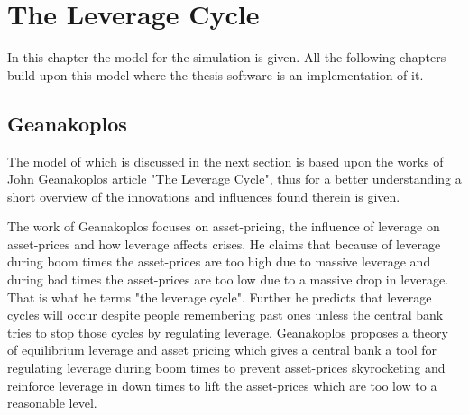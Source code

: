 \documentclass[../Bachelorarbeit.tex]{subfiles}
\begin{document}
\chapter{The Leverage Cycle}
\label{ch:leverageCycle}

In this chapter the model for the simulation is given. All the following chapters build upon this model where the thesis-software is an implementation of it. 

\section{Geanakoplos}
The model of \cite{Breuer2015} which is discussed in the next section is based upon the works of John Geanakoplos article \cite{Geanakoplos2009} "The Leverage Cycle", thus for a better understanding a short overview of the innovations and influences found therein is given.

\medskip

The work of Geanakoplos focuses on asset-pricing, the influence of leverage on asset-prices and how leverage affects crises. He claims that because of leverage during boom times the asset-prices are too high due to massive leverage and during bad times the asset-prices are too low due to a massive drop in leverage. That is what he terms "the leverage cycle". Further he predicts that leverage cycles will occur despite people remembering past ones unless the central bank tries to stop those cycles by regulating leverage. Geanakoplos proposes a theory of equilibrium leverage and asset pricing which gives a central bank a tool for regulating leverage during boom times to prevent asset-prices skyrocketing and reinforce leverage in down times to lift the asset-prices which are too low to a reasonable level.
\end{document}
